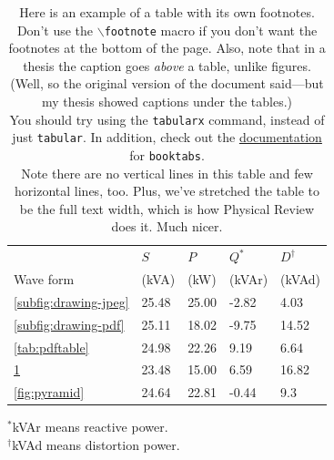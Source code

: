 \begin{table}[htb]
  \caption[Example of a table with its own footnotes]{
		Here is an example of a table with its own footnotes.  Don't use the
		\texttt{$\backslash$footnote} macro if you don't want the footnotes at the
		bottom of the page.  Also, note that in a thesis the caption goes
		\emph{above} a table, unlike figures.  (Well, so the original version of the document said---but my thesis showed captions under the tables.)
		\\
		You should try using the \texttt{tabularx} command, instead of just \texttt{tabular}.  In addition, check out the \href{https://ctan.math.utah.edu/ctan/tex-archive/macros/latex/contrib/booktabs/booktabs.pdf}{documentation} for \texttt{booktabs}.
		\\
		Note there are no vertical lines in this table and few horizontal lines, too.  Plus, we've stretched the table to be the full text width, which is how Physical Review does it.  Much nicer.
	}

	\begin{tabularx}{\textwidth}{XXXXX}
	\toprule
	& $S$ & $P$ &   $Q^{\ast}$  & $D^{\dagger}$ \\	%
	Wave form & (kVA) & (kW) & (kVAr) & (kVAd) \\
	\midrule
	\cref{subfig:drawing-jpeg}  & 25.48 & 25.00 & -2.82 & 4.03 \\
	\cref{subfig:drawing-pdf}  & 25.11 & 18.02 & -9.75 & 14.52 \\
	\cref{tab:pdftable}  & 24.98 & 22.26 & 9.19 & 6.64 \\
	\cref{tab:powertable}  & 23.48 & 15.00 & 6.59 & 16.82 \\
	\cref{fig:pyramid}  & 24.64 & 22.81 & -0.44 & 9.3 \\
	\bottomrule
	\end{tabularx}

	\begin{center}
		${}^\ast$kVAr means reactive power. \\
		${}^\dagger$kVAd means distortion power.
	\end{center}

	\label{tab:powertable}
\end{table}
